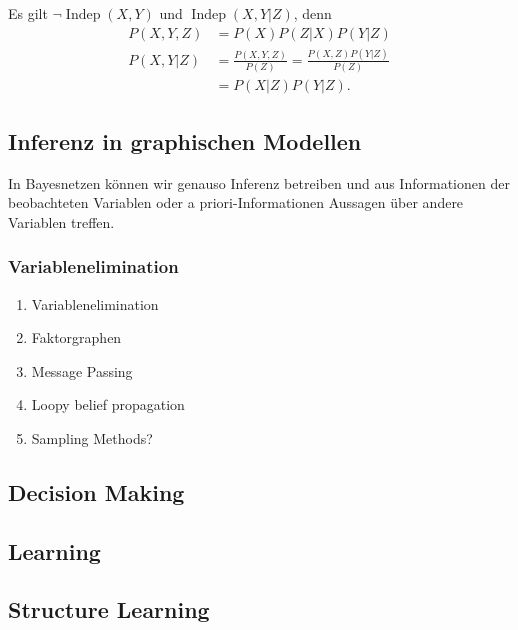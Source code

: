 \documentclass[ngerman]{../LaTeX-Templates/Paper/paper}
\newcommand{\independent}{\ensuremath{\operatorname{Indep}}}
\begin{document}
\begin{enumerate}
\begin{center}
	\end{center}
	Es gilt $\neg\independent(X,Y)$ und $\independent(X,Y|Z)$, denn
	\begin{align*}
		P(X,Y,Z)&=P(X)P(Z|X)P(Y|Z)\\
		P(X,Y|Z)&=\frac{P(X,Y,Z)}{P(Z)}=\frac{P(X,Z)P(Y|Z)}{P(Z)}\\
		&=P(X|Z)P(Y|Z).
	\end{align*}

\end{enumerate}



\subsection{Inferenz in graphischen Modellen}
In Bayesnetzen können wir genauso Inferenz betreiben und aus Informationen der beobachteten Variablen oder a priori-Informationen Aussagen über andere Variablen treffen.

\subsubsection{Variablenelimination}
\begin{enumerate}
	\item Variablenelimination
	\item Faktorgraphen
	\item Message Passing
	\item Loopy belief propagation
	\item Sampling Methods?
\end{enumerate}

\subsection{Decision Making}
\subsection{Learning}
\subsection{Structure Learning}
\end{document}
